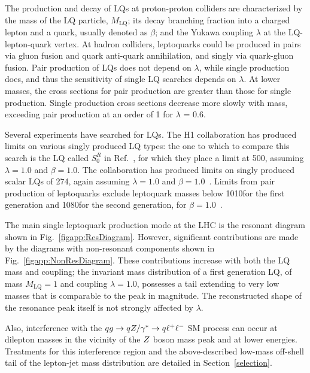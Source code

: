 The production and decay of LQs at proton-proton colliders are characterized by the mass of the LQ particle, $M_{\text{LQ}}$; its decay branching fraction into a charged lepton and a quark, usually denoted as $\beta$; and the Yukawa coupling $\lambda$ at the LQ-lepton-quark vertex. At hadron colliders, leptoquarks could be produced in pairs via gluon fusion and quark anti-quark annihilation, and singly via quark-gluon fusion. Pair production of LQs does not depend on $\lambda$, while single production does, and thus the sensitivity of single LQ searches depends on $\lambda$.  At lower masses, the cross sections for pair production are greater than those for single production.  Single production cross sections decrease more slowly with mass, exceeding pair production at an order of 1 \TeV for $\lambda$ = 0.6.

Several experiments have searched for LQs.  The H1 collaboration has produced limits on various singly produced LQ types: the one to which to compare this search is the LQ called $S^{R}_{0}$ in Ref.~\cite{Collaboration:2011qaa}, for which they place a limit at 500\GeV, assuming $\lambda=1.0$ and $\beta=1.0$.  The \DZERO collaboration has produced limits on singly produced scalar LQs of 274\GeV, again assuming $\lambda=1.0$ and $\beta=1.0$~\cite{Abazov:2006ej}.  Limits from pair production of leptoquarks exclude leptoquark masses below 1010\GeV for the first generation and 1080\GeV for the second generation, for $\beta=1.0$~\cite{PairProd}.

The main single leptoquark production mode at the LHC is the resonant diagram shown in Fig.~\ref{figapp:ResDiagram}.  However, significant contributions are made by the diagrams with non-resonant components shown in Fig.~\ref{figapp:NonResDiagram}.  These contributions increase with both the LQ mass and coupling; the invariant mass distribution of a first generation LQ, of mass $M_{\text{LQ}} = 1$ \TeV and coupling $\lambda=1.0$, possesses a tail extending to very low masses that is comparable to the peak in magnitude.  The reconstructed shape of the resonance peak itself is not strongly affected by $\lambda$.

Also, interference with the $\relax{q} \relax{g} \rightarrow \relax{q} \relax{Z}/\gamma^{*}\rightarrow \relax{q} \ell^{+} \ell^{-}$ SM process can occur at dilepton masses in the vicinity of the $\relax{Z}$ boson mass peak and at lower energies.  Treatments for this interference region and the above-described low-mass off-shell tail of the lepton-jet mass distribution are detailed in Section~\ref{selection}.

